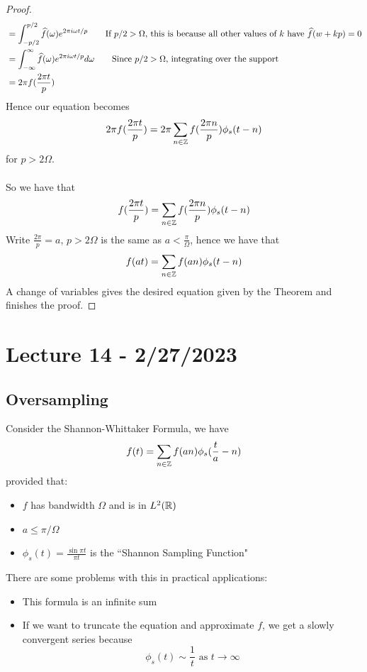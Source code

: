 \documentclass{article}
\begin{document}
\begin{proof}
\begin{align*}
        &= \int_{-p/2}^{p/2} \widehat{f}(\omega) e^{2\pi i \omega t/p} \tag*{If $p/2 > \Omega$, this is because all other values of $k$ have $\widehat{f}(w + kp) = 0$}\\
        &= \int_{-\infty}^\infty \widehat{f}(\omega) e^{2\pi i \omega t/p} d\omega \tag*{Since $p/2 > \Omega$, integrating over the support}\\
        &= 2\pi f(\frac{2\pi t}{p})
    \end{align*}
    Hence our equation becomes
    \[2\pi f(\frac{2\pi t}{p}) = 2\pi \sum_{n \in \mathbb{Z}} f(\frac{2\pi n}{p}) \phi_s(t - n)\]
    for $p > 2 \Omega$.\\\\
    So we have that
    \[f(\frac{2\pi t}{p}) = \sum_{n \in \mathbb{Z}} f(\frac{2\pi n}{p}) \phi_s(t - n)\]
    Write $\frac{2\pi}{p} = a$, $p > 2 \Omega$ is the same as $a < \frac{\pi}{\Omega}$, hence we have that
    \[f(at) = \sum_{n \in \mathbb{Z}} f(an) \phi_s(t - n)\]
    A change of variables gives the desired equation given by the Theorem and finishes the proof.
\end{proof}

\newpage
\section{Lecture 14 - 2/27/2023}

\subsection{Oversampling}

Consider the Shannon-Whittaker Formula, we have
\[f(t) = \sum_{n \in \mathbb{Z}} f(an) \phi_s(\frac{t}{a} - n)\]
provided that:
\begin{itemize}
    \item $f$ has bandwidth $\Omega$ and is in $L^2(\mathbb{R})$
    \item $a \leq \pi/\Omega$
    \item $\phi_s(t) = \frac{\sin \pi t}{\pi t}$ is the ``Shannon Sampling Function"
\end{itemize}

There are some problems with this in practical applications:
\begin{itemize}
    \item This formula is an infinite sum
    \item If we want to truncate the equation and approximate $f$, we get a slowly convergent series because
    \[\phi_s(t) \sim \frac{1}{t} \text{ as } t \to \infty\]
\end{itemize}
\end{document}

